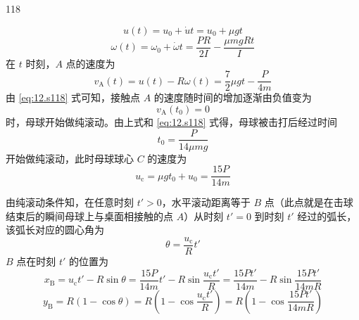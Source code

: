 \begin{solution}{118}
\begin{subsolution}
        \begin{equation}
            u(t) = u_{0} + \dot{u} t = u_{0} + \mu g t
            \label{eq:10.s118}
        \end{equation}
        \begin{equation}
            \omega(t) = \omega_{0} + \dot{\omega} t = \frac{PR}{2I} - \frac{\mu m g R t}{I}
            \label{eq:11.s118}
        \end{equation}
        在 $t$ 时刻，$A$ 点的速度为
        \begin{equation}
            v_{\mathrm{A}}(t) = u(t) - R \omega(t) = \frac{7}{2} \mu g t - \frac{P}{4m}
            \label{eq:12.s118}
        \end{equation}
        由 \eqref{eq:12.s118} 式可知，接触点 $A$ 的速度随时间的增加逐渐由负值变为
        \begin{equation}
            v_{\mathrm{A}}(t_{0}) = 0
        \end{equation}
        时，母球开始做纯滚动。由上式和 \eqref{eq:12.s118} 式得，母球被击打后经过时间
        \begin{equation}
            t_{0} = \frac{P}{14 \mu m g}
            \label{eq:13.s118}
        \end{equation}
        开始做纯滚动，此时母球球心 $C$ 的速度为
        \begin{equation}
            u_{\mathrm{c}} = \mu g t_{0} + u_{0} = \frac{15P}{14m}
            \label{eq:14.s118}
        \end{equation}
    \end{subsolution}
    \begin{subsolution}
        由纯滚动条件知，在任意时刻 $t' > 0$，水平滚动距离等于 $B$ 点（此点就是在击球结束后的瞬间母球上与桌面相接触的点 $A$）从时刻 $t' = 0$ 到时刻 $t'$ 经过的弧长，该弧长对应的圆心角为
        \begin{equation}
            \theta = \frac{u_{\mathrm{c}}}{R} t'
            \label{eq:15.s118}
        \end{equation}
        $B$ 点在时刻 $t'$ 的位置为
        \begin{equation}
            x_{\mathrm{B}} = u_{\mathrm{c}} t' - R \sin \theta = \frac{15P}{14m} t' - R \sin \frac{u_{\mathrm{c}} t'}{R} = \frac{15P t'}{14m} - R \sin \frac{15P t'}{14mR}
            \label{eq:16.s118}
        \end{equation}
        \begin{equation}
            y_{\mathrm{B}} = R (1 - \cos \theta) = R \left(1 - \cos \frac{u_{\mathrm{c}} t'}{R}\right) = R \left(1 - \cos \frac{15P t'}{14mR}\right)

\end{equation}
\end{subsolution}
\end{solution}
